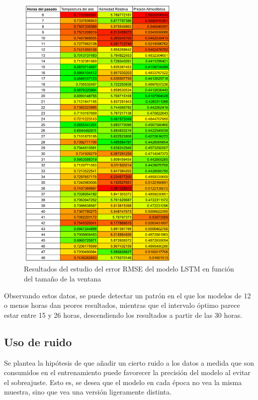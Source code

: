 \begin{figure}[H]
    \centering
    \includegraphics[width=0.7\textwidth]{images/past_window_size.png}
    \caption{Resultados del estudio del error RMSE del modelo LSTM en función del tamaño de la ventana }
    \label{window_size}
\end{figure}

Observando estos datos, se puede detectar un patrón en el que los modelos de 12 o menos horas dan peores resultados, 
mientras que el intervalo óptimo parece estar entre 15 y 26 horas, descendiendo los resultados a partir de las 30 horas.


\subsection{Uso de ruido}
Se plantea la hipótesis de que añadir un cierto ruido a los datos a medida que son consumidos en el entrenamiento puede favorecer la precisión del modelo al evitar el sobreajuste.
Esto es, se desea que el modelo en cada época no vea la misma muestra, sino que vea una versión ligeramente distinta. 

